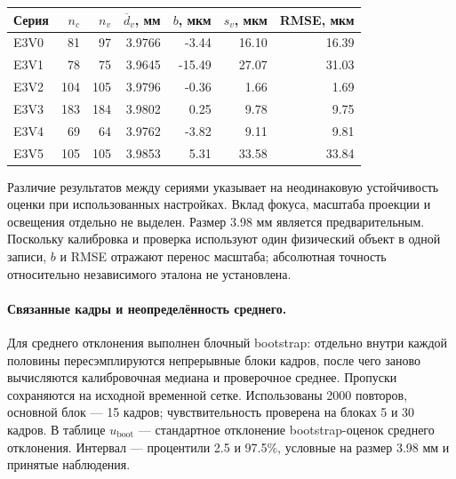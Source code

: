 \documentclass[12pt,a4paper]{article}
\begin{document}
\begin{center}\small
\begin{tabular}{lrrrrrr}\toprule
Серия & $n_c$ & $n_v$ & $\overline d_v$, мм & $b$, мкм & $s_v$, мкм & RMSE, мкм \\
\midrule
E3V0 & 81 & 97 & 3.9766 & -3.44 & 16.10 & 16.39 \\
E3V1 & 78 & 75 & 3.9645 & -15.49 & 27.07 & 31.03 \\
E3V2 & 104 & 105 & 3.9796 & -0.36 & 1.66 & 1.69 \\
E3V3 & 183 & 184 & 3.9802 & 0.25 & 9.78 & 9.75 \\
E3V4 & 69 & 64 & 3.9762 & -3.82 & 9.11 & 9.81 \\
E3V5 & 105 & 105 & 3.9853 & 5.31 & 33.58 & 33.84 \\
\bottomrule\end{tabular}\end{center}
Различие результатов между сериями указывает на неодинаковую устойчивость оценки при использованных настройках. Вклад фокуса, масштаба проекции и освещения отдельно не выделен. Размер 3.98 мм является предварительным. Поскольку калибровка и проверка используют один физический объект в одной записи, $b$ и RMSE отражают перенос масштаба; абсолютная точность относительно независимого эталона не установлена.

\paragraph{Связанные кадры и неопределённость среднего.}
Для среднего отклонения выполнен блочный bootstrap: отдельно внутри каждой половины пересэмплируются непрерывные блоки кадров, после чего заново вычисляются калибровочная медиана и проверочное среднее. Пропуски сохраняются на исходной временной сетке. Использованы 2000 повторов, основной блок --- 15 кадров; чувствительность проверена на блоках 5 и 30 кадров. В таблице $u_{\mathrm{boot}}$ --- стандартное отклонение bootstrap-оценок среднего отклонения. Интервал --- процентили 2.5 и 97.5\%, условные на размер 3.98 мм и принятые наблюдения.
\end{document}

